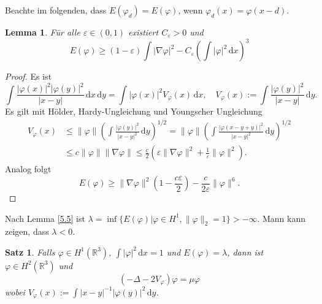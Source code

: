 \documentclass[
paper=a4,
bibtotocnumbered,
liststotocnumbered,
tablecaptionabove,
pointlessnumbers,
twoside,
openright,
10pt
]
{report}
\let\phi\varphi
\newtheorem{satz}[thm]{Satz}
\newtheorem{lem}[thm]{Lemma}
\theoremstyle{definition}
\numberwithin{equation}{chapter}
\begin{document}
Beachte im folgenden, dass $E(\phi_d)= E(\phi)$, wenn $\phi_d(x) = \phi(x-d)$.
\begin{lem}\label{5.5}
Für alle $\varepsilon \in (0,1)$ existiert $C_\varepsilon >0$ und
\begin{equation}
E(\phi) \ge (1-\varepsilon) \int |\nabla \phi|^2- C_{\varepsilon} \left (\int |\phi|^2\, \mathrm dx\right )^3
\end{equation}
\end{lem}
\begin{proof}
Es ist
\begin{equation}
\int \frac{|\phi(x)|^2|\phi(y)|^2}{|x-y|} \, \mathrm dx \, \mathrm dy = \int |\phi(x)|^2 V_\phi(x) \, \mathrm dx, \quad V_\phi(x) := \int \frac{|\phi(y)|^2}{|x-y|} \, \mathrm dy.
\end{equation}
Es gilt mit Hölder, Hardy-Ungleichung und Youngscher Ungleichung
\begin{align*}
V_\phi(x) &\le \| \phi\| \left ( \int \frac{|\phi(y)|^2}{|x-y|^2}\, \mathrm dy \right )^{1/2} = \| \phi\| \left ( \int \frac{|\phi(x-y+y)|^2}{|x-y|^2} \, \mathrm dy\right )^{1/2}\\
&\le c\| \phi\| \| \nabla \phi\| \le \frac{c}{2} (\varepsilon \| \nabla \phi\|^2 + \frac{1}{\varepsilon} \| \phi\|^2).
\end{align*}
Analog folgt
\begin{equation}
E(\phi) \ge \| \nabla \phi\|^2 ( 1- \frac{c \varepsilon}{2}) - \frac{c}{2\varepsilon} \|\phi\|^6.
\end{equation}
\end{proof}
Nach Lemma \eqref{5.5} ist $\lambda = \inf \{ E(\phi)  | \phi \in H^1, \| \phi\|_2=1\} >-\infty$. Mann kann zeigen, dass $\lambda <0$.
\begin{satz}\label{9.5}
Falls $\phi \in H^1(\mathbb R^3)$, $\int |\phi|^2\, \mathrm dx =1$ und $E(\phi) = \lambda$, dann ist $\phi \in H^2(\mathbb R^3)$ und 
\begin{equation}
(-\Delta - 2 V_\phi) \phi = \mu \phi
\end{equation}
wobei $V_\phi(x):= \int |x-y|^{-1}|\phi(y)|^2\, \mathrm dy$.
\end{satz}
\end{document}
